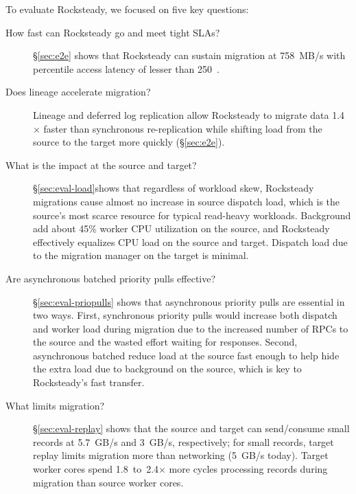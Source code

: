 To evaluate Rocksteady, we focused on five key questions:
\begin{description}
\item[How fast can Rocksteady go and meet tight SLAs?]
  \S\ref{sec:e2e} shows that Rocksteady can sustain migration at
    758~MB/s with \nnnth percentile access latency of lesser than 250~\us.
\item[Does lineage accelerate migration?]
  Lineage and deferred log replication allow Rocksteady to migrate data
    1.4$\times$ faster than synchronous re-replication while shifting
    load from the source to the target more quickly (\S\ref{sec:e2e}).
\item[What is the impact at the source and target?]
  \S\ref{sec:eval-load}\linebreak{}shows that regardless of workload skew, Rocksteady
    migrations cause almost no increase in source dispatch load, which is the source's
    most scarce resource for typical read-heavy workloads. Background \pulls
    add about 45\% worker CPU utilization on the source, and Rocksteady
    effectively equalizes CPU load on the source and target.
    Dispatch load due to the migration manager on the target is minimal.
\item[Are asynchronous batched priority pulls effective?]
  \S\ref{sec:eval-priopulls} shows that asynchronous priority pulls are
    essential in two ways. First, synchronous priority pulls would increase both
    dispatch and worker load during migration due to the increased number of
    RPCs to the source and the wasted effort waiting for \priopull responses. Second,
    asynchronous batched \priopulls reduce load at the source fast enough to help
    hide the extra load due to background \pulls on the source, which is key to
    Rocksteady's fast transfer.
\item[What limits migration?]
  \S\ref{sec:eval-replay} shows that the source and target can send/consume
    small records at 5.7~GB/s and 3~GB/s, respectively; for small
    records,
    target replay limits migration more than
    networking (5~GB/s today).
    Target worker cores spend 1.8~to~2.4$\times$ more cycles
    processing records during migration than source worker cores.

\end{description}

